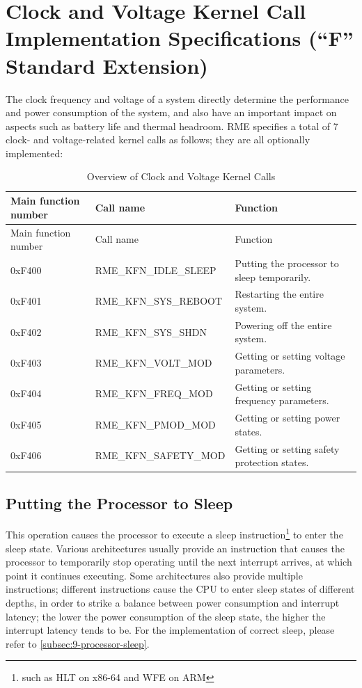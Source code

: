 \section{Clock and Voltage Kernel Call Implementation Specifications (``F'' Standard Extension)}\label{sec:8-clock-and-voltage-kernel-calls}
\nopagebreak[4]

The clock frequency and voltage of a system directly determine the performance and power consumption of the system, and also have an important impact on aspects such as battery life and thermal headroom. RME specifies a total of 7 clock- and voltage-related kernel calls as follows; they are all optionally implemented:

\begin{xltabular}{\textwidth}{@{}>{\hsize\raggedright\arraybackslash}X>{\hsize\raggedright\arraybackslash}X>{\hsize\raggedright\arraybackslash}X@{}}
\caption{Overview of Clock and Voltage Kernel Calls}\label{tab:8-42-clock-and-voltage-kernel-calls}\\
\toprule
Main function number & Call name & Function\tabularnewline
\endfirsthead
\toprule
Main function number & Call name & Function\tabularnewline
\midrule
\endhead
\bottomrule
\endlastfoot
0xF400 & RME\_KFN\_IDLE\_SLEEP & Putting the processor to sleep temporarily.\tabularnewline
0xF401 & RME\_KFN\_SYS\_REBOOT & Restarting the entire system.\tabularnewline
0xF402 & RME\_KFN\_SYS\_SHDN & Powering off the entire system.\tabularnewline
0xF403 & RME\_KFN\_VOLT\_MOD & Getting or setting voltage parameters.\tabularnewline
0xF404 & RME\_KFN\_FREQ\_MOD & Getting or setting frequency parameters.\tabularnewline
0xF405 & RME\_KFN\_PMOD\_MOD & Getting or setting power states.\tabularnewline
0xF406 & RME\_KFN\_SAFETY\_MOD & Getting or setting safety protection states.\tabularnewline
\end{xltabular}
\nopagebreak[4]

\subsection{Putting the Processor to Sleep}\label{subsec:8-put-processor-to-sleep}

This operation causes the processor to execute a sleep instruction\footnote{such as HLT on x86-64 and WFE on ARM} to enter the sleep state. Various architectures usually provide an instruction that causes the processor to temporarily stop operating until the next interrupt arrives, at which point it continues executing. Some architectures also provide multiple instructions; different instructions cause the CPU to enter sleep states of different depths, in order to strike a balance between power consumption and interrupt latency; the lower the power consumption of the sleep state, the higher the interrupt latency tends to be. For the implementation of correct sleep, please refer to \ref{subsec:9-processor-sleep}.

